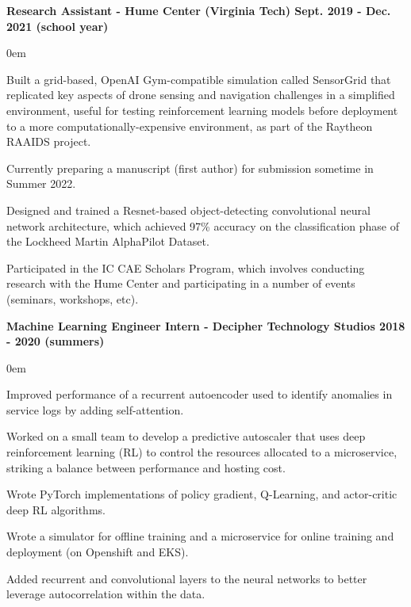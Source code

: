\documentclass{article}
\begin{document}
\begin{center}
\begin{flushleft}
    \textbf{Research Assistant - Hume Center (Virginia Tech) \hfill Sept. 2019 - Dec. 2021 (school year)}
    \begin{compactitem}
      \itemsep0em
      \item Built a grid-based, OpenAI Gym-compatible simulation called SensorGrid that replicated key aspects of drone sensing and navigation challenges in a simplified environment, useful for testing reinforcement learning models before deployment to a more computationally-expensive environment, as part of the Raytheon RAAIDS project. 
      \item Currently preparing a manuscript (first author) for submission sometime in Summer 2022.
      \item Designed and trained a Resnet-based object-detecting convolutional neural network architecture, which achieved 97\% accuracy on the classification phase of the Lockheed Martin AlphaPilot Dataset. %
      \item Participated in the IC CAE Scholars Program, which involves conducting research with the Hume Center and participating in a number of events (seminars, workshops, etc).
    \end{compactitem}

    \textbf{Machine Learning Engineer Intern - Decipher Technology Studios \hfill 2018 - 2020 (summers)}
    \begin{compactitem}
      \itemsep0em
      \item Improved performance of a recurrent autoencoder used to identify anomalies in service logs by adding self-attention.
      \item Worked on a small team to develop a predictive autoscaler that uses deep reinforcement learning (RL) to control the resources allocated to a microservice, striking a balance between performance and hosting cost.
      \item Wrote PyTorch implementations of policy gradient, Q-Learning, and actor-critic deep RL algorithms.%
      \item Wrote a simulator for offline training and a microservice for online training and deployment (on Openshift and EKS).
      \item Added recurrent and convolutional layers to the neural networks to better leverage autocorrelation within the data.
    \end{compactitem}


\end{flushleft}
\end{center}
\end{document}
